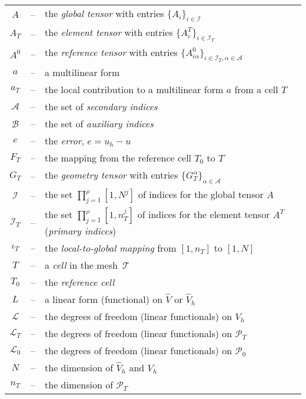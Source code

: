 \documentclass{article}
\begin{document}
\small \linespread{1.2}
  \begin{longtable}{ccl}
    $A$ &--&
    the \emph{global tensor} with entries $\{A_i\}_{i\in\mathcal{I}}$ \\
    $A_T$ &--&
    the \emph{element tensor} with entries $\{A^T_i\}_{i\in\mathcal{I}_T}$ \\
    $A^0$ &--&
    the \emph{reference tensor} with entries $\{A^0_{i\alpha}\}_{i\in\mathcal{I}_T,\alpha\in\mathcal{A}}$ \\
    $a$ &--&
    a multilinear form \\
    $a_T$ &--&
    the local contribution to a multilinear form $a$ from a cell $T$ \\
    $\mathcal{A}$ &--&
    the set of \emph{secondary indices} \\
    $\mathcal{B}$ &--&
    the set of \emph{auxiliary indices} \\
    $e$ &--&
    the \emph{error}, $e = u_h - u$ \\
    $F_T$ &--&
    the mapping from the reference cell $T_0$ to $T$ \\
    $G_T$ &--&
    the \emph{geometry tensor} with entries $\{G_T^{\alpha}\}_{\alpha\in\mathcal{A}}$ \\
    $\mathcal{I}$ &--&
    the set $\prod_{j=1}^{\rho} [1,N^j]$ of indices for the global tensor $A$ \\
    $\mathcal{I}_T$ &--&
    the set $\prod_{j=1}^{\rho} [1,n_T^j]$ of indices for the element tensor $A^T$ (\emph{primary indices}) \\
    $\iota_T$ &--&
    the \emph{local-to-global mapping} from $[1,n_T]$ to $[1,N]$ \\
    $T$ &--&
    a \emph{cell} in the mesh~$\mathcal{T}$ \\
    $T_0$ &--&
    the \emph{reference cell} \\
    $L$ &--&
    a linear form (functional) on $\hat{V}$ or $\hat{V}_h$ \\
    $\mathcal{L}$ &--&
    the degrees of freedom (linear functionals) on $V_h$ \\
    $\mathcal{L}_T$ &--&
    the degrees of freedom (linear functionals) on $\mathcal{P}_T$ \\
    $\mathcal{L}_0$ &--&
    the degrees of freedom (linear functionals) on $\mathcal{P}_0$ \\
    $N$ &--&
    the dimension of $\hat{V}_h$ and $V_h$ \\
    $n_T$ &--&
    the dimension of $\mathcal{P}_T$ \\

\end{longtable}
\end{document}
